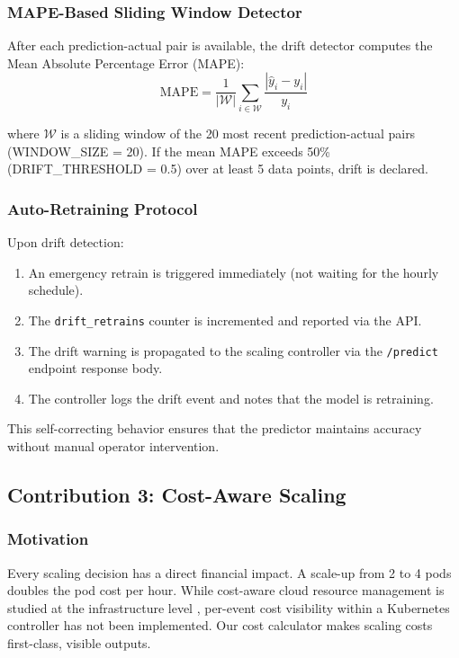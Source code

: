 \documentclass[journal]{IEEEtran}
\begin{document}
\subsubsection{MAPE-Based Sliding Window Detector}
After each prediction-actual pair is available, the drift detector computes the Mean Absolute Percentage Error (MAPE):
\begin{equation}
\text{MAPE} = \frac{1}{|\mathcal{W}|} \sum_{i \in \mathcal{W}} \frac{|\hat{y}_i - y_i|}{y_i}
\label{eq:mape}
\end{equation}

where $\mathcal{W}$ is a sliding window of the 20 most recent prediction-actual pairs (WINDOW\_SIZE = 20). If the mean MAPE exceeds 50\% (DRIFT\_THRESHOLD = 0.5) over at least 5 data points, drift is declared.

\subsubsection{Auto-Retraining Protocol}
Upon drift detection:
\begin{enumerate}
    \item An emergency retrain is triggered immediately (not waiting for the hourly schedule).
    \item The \texttt{drift\_retrains} counter is incremented and reported via the API.
    \item The drift warning is propagated to the scaling controller via the \texttt{/predict} endpoint response body.
    \item The controller logs the drift event and notes that the model is retraining.
\end{enumerate}

This self-correcting behavior ensures that the predictor maintains accuracy without manual operator intervention.

\subsection{Contribution 3: Cost-Aware Scaling}
\label{sec:cost}

\subsubsection{Motivation}
Every scaling decision has a direct financial impact. A scale-up from 2 to 4 pods doubles the pod cost per hour. While cost-aware cloud resource management is studied at the infrastructure level \cite{lin2020}, per-event cost visibility within a Kubernetes controller has not been implemented. Our cost calculator makes scaling costs first-class, visible outputs.
\end{document}
